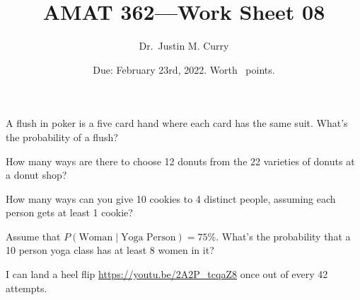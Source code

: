 \documentclass[addpoints,12pt]{exam}
\title{\vspace{-1in} AMAT 362---Work Sheet 08}
\date{Due: February 23rd, 2022. Worth \numpoints\ points.}
\author{Dr.~Justin M. Curry}
\begin{document}
\maketitle


\begin{questions}
\question[1] A flush in poker is a five card hand where each card has the same suit. What's the probability of a flush?

\vspace{1in}

\question[1] How many ways are there to choose 12 donuts from the 22 varieties of donuts at a donut shop?

\vspace{1in}

\question[2] How many ways can you give 10 cookies to 4 distinct people, assuming each person gets at least 1 cookie?

\vspace{1in}

\question[2] Assume that $P(\text{Woman}\mid \text{Yoga Person})=75\%$. What's the probability that a 10 person yoga class has at least 8 women in it?

\vspace{1.2in}

\question[6] I can land a heel flip \url{https://youtu.be/2A2P_tcqaZ8} once out of every 42 attempts.
\noaddpoints
{}
\end{questions}
\end{document}
